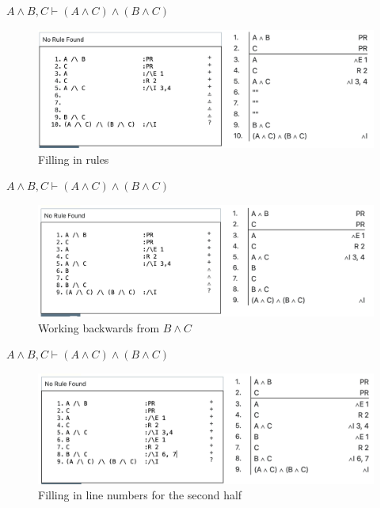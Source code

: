 \documentclass[
  ignorenonframetext,
]{beamer}
\renewcommand{\,}{\text{, }}
\begin{document}
\begin{frame}{\(A \wedge B, C \vdash (A \wedge C) \wedge (B \wedge C)\)}
\protect\hypertarget{a-wedge-b-c-vdash-a-wedge-c-wedge-b-wedge-c-3}{}
\begin{figure}
\centering
\includegraphics[width=\textwidth,height=0.75\textheight]{5_4d.png}
\caption{Filling in rules}
\end{figure}
\end{frame}

\begin{frame}{\(A \wedge B, C \vdash (A \wedge C) \wedge (B \wedge C)\)}
\protect\hypertarget{a-wedge-b-c-vdash-a-wedge-c-wedge-b-wedge-c-4}{}
\begin{figure}
\centering
\includegraphics[width=\textwidth,height=0.75\textheight]{5_4e.png}
\caption{Working backwards from \(B \wedge C\)}
\end{figure}
\end{frame}

\begin{frame}{\(A \wedge B, C \vdash (A \wedge C) \wedge (B \wedge C)\)}
\protect\hypertarget{a-wedge-b-c-vdash-a-wedge-c-wedge-b-wedge-c-5}{}
\begin{figure}
\centering
\includegraphics[width=\textwidth,height=0.75\textheight]{5_4f.png}
\caption{Filling in line numbers for the second half}
\end{figure}
\end{frame}
\end{document}
